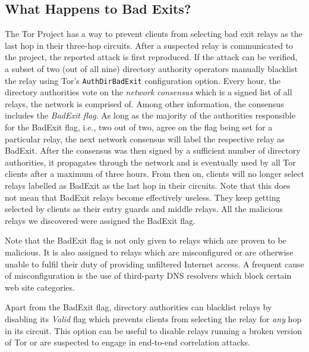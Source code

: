 \documentclass[letterpaper,twocolumn,10pt]{article}
\begin{document}
\subsection{What Happens to Bad Exits?}
The Tor Project has a way to prevent clients from selecting bad exit relays as the last hop in their
three-hop circuits.  After a suspected relay is communicated to the project, the reported attack is
first reproduced.  If the attack can be verified, a subset of two (out of all nine) directory
authority operators manually blacklist the relay using Tor's \texttt{AuthDirBadExit} configuration
option.  Every hour, the directory authorities vote on the \emph{network consensus} which is a
signed list of all relays, the network is comprised of.  Among other information, the consensus
includes the \emph{BadExit flag}.  As long as the majority of the authorities responsible for the
BadExit flag, i.e., two out of two, agree on the flag being set for a particular relay, the next
network consensus will label the respective relay as BadExit.  After the consensus was then signed
by a sufficient number of directory authorities, it propagates through the network and is eventually
used by all Tor clients after a maximum of three hours.  From then on, clients will no longer select
relays labelled as BadExit as the last hop in their circuits.  Note that this does not mean that
BadExit relays become effectively useless.  They keep getting selected by clients as their entry
guards and middle relays.  All the malicious relays we discovered were assigned the BadExit flag.

Note that the BadExit flag is not only given to relays which are proven to be malicious.  It is also
assigned to relays which are misconfigured or are otherwise unable to fulfil their duty of providing
unfiltered Internet access.  A frequent cause of misconfiguration is the use of third-party DNS
resolvers which block certain web site categories.

Apart from the BadExit flag, directory authorities can blacklist relays by disabling its
\emph{Valid} flag which prevents clients from selecting the relay for \emph{any} hop in its circuit.
This option can be useful to disable relays running a broken version of Tor or are suspected to
engage in end-to-end correlation attacks.
\end{document}
